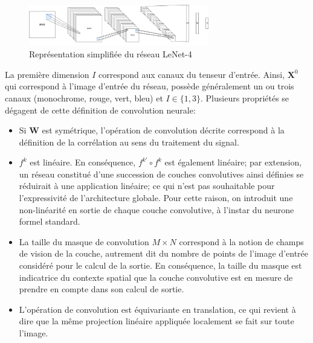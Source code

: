
\begin{figure}
	\centering
	\includegraphics[width=0.7\textwidth]{gnuplot/revue_litterature/LeNet}
	\caption{Représentation simplifiée du réseau LeNet-4}
	\label{fig:lenet}
\end{figure}


La première dimension $I$ correspond aux canaux du tenseur d'entrée. Ainsi, $\mathbf{X}^0$ qui correspond à l'image d'entrée du réseau, possède généralement un ou trois canaux (monochrome, \og rouge, vert, bleu\fg) et $I \in \{ 1, 3\}$.  
Plusieurs propriétés se dégagent de cette définition de convolution neurale:
\begin{itemize}
	\item Si $\mathbf{W}$ est symétrique, l'opération de convolution décrite correspond à la définition de la corrélation au sens du traitement du signal.
	
	\item $f^k$ est linéaire. En conséquence, $f^{k'} \circ f^{k}$ est également linéaire; par extension, un réseau constitué d'une succession de couches convolutives ainsi définies se réduirait à une application linéaire; ce qui n'est pas souhaitable pour l'expressivité de l'architecture globale. Pour cette raison, on introduit une non-linéarité en sortie de chaque couche convolutive, à l'instar du neurone formel standard.

	\item La taille du masque de convolution $M \times N$ correspond à la notion de champs de vision de la couche, autrement dit du nombre de points de l'image d'entrée considéré pour le calcul de la sortie. En conséquence, la taille du masque est indicatrice du contexte spatial que la couche convolutive est en mesure de prendre en compte dans son calcul de sortie.
	
	\item L'opération de convolution est équivariante en translation, ce qui revient à dire que la même projection linéaire appliquée localement se fait sur toute l'image.
\end{itemize}

